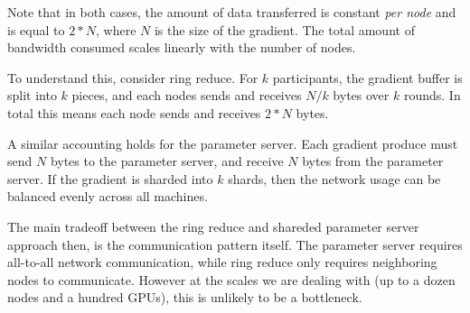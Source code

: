 Note that in both cases, the amount of data transferred is constant \textit{per node} and is equal to $2 * N$, where $N$ is the size of the gradient. The total amount of bandwidth consumed scales linearly with the number of nodes.

To understand this, consider ring reduce. For $k$ participants, the gradient buffer is split into $k$ pieces, and each nodes sends and receives $N / k$ bytes over $k$ rounds. In total this means each node sends and receives $2 * N$ bytes.

A similar accounting holds for the parameter server. Each gradient produce must send $N$ bytes to the parameter server, and receive $N$ bytes from the parameter server. If the gradient is sharded into $k$ shards, then the network usage can be balanced evenly across all machines.

The main tradeoff between the ring reduce and shareded parameter server approach then, is the communication pattern itself. The parameter server requires all-to-all network communication, while ring reduce only requires neighboring nodes to communicate. However at the scales we are dealing with (up to a dozen nodes and a hundred GPUs), this is unlikely to be a bottleneck.
